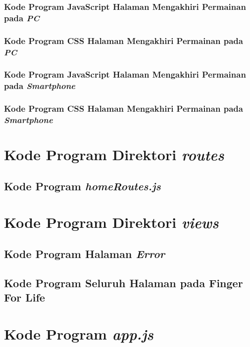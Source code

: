 \subsubsection{Kode Program JavaScript Halaman Mengakhiri Permainan pada \textit{PC}}


\subsubsection{Kode Program CSS Halaman Mengakhiri Permainan pada \textit{PC}}


\subsubsection{Kode Program JavaScript Halaman Mengakhiri Permainan pada \textit{Smartphone}}


\subsubsection{Kode Program CSS Halaman Mengakhiri Permainan pada \textit{Smartphone}}


\section{Kode Program Direktori \textit{routes}}
\subsection{Kode Program \textit{homeRoutes.js}}


\section{Kode Program Direktori \textit{views}}
\subsection{Kode Program Halaman \textit{Error}}


\subsection{Kode Program Seluruh Halaman pada Finger For Life}


\section{Kode Program \textit{app.js}}


